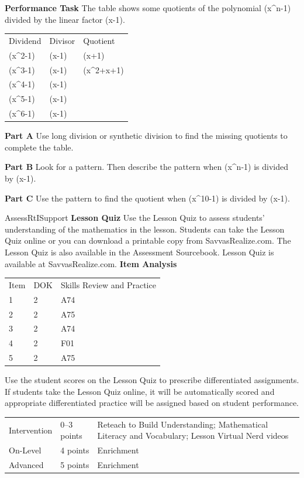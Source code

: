 \documentclass{article}
\newenvironment{practice}[2]{}{}        %
\newenvironment{te-addendum}[2]{}{}     %
\newcommand{\answer}[1]{}               %
\begin{document}
\begin{practice}{38}{3}
\textbf{Performance Task} The table shows some quotients of the polynomial (x^n-1) divided by the linear factor (x-1).
\begin{tabular}{lll}
Dividend & Divisor & Quotient \\
(x^2-1) & (x-1) & (x+1) \\
(x^3-1) & (x-1) & (x^2+x+1) \\
(x^4-1) & (x-1) & \\
(x^5-1) & (x-1) & \\
(x^6-1) & (x-1) & \\
\end{tabular}
\textbf{Part A} Use long division or synthetic division to find the missing quotients to complete the table.
\answer{(x^3+x^2+x+1); (x^4+x^3+x^2+x+1); (x^5+x^4+x^3+x^2+x+1)}
\textbf{Part B} Look for a pattern. Then describe the pattern when (x^n-1) is divided by (x-1).
\answer{When (x^n-1) is divided by (x-1), the quotient is (x^{n-1}+x^{n-2}+x^{n-3}+\cdots+x+1).}
\textbf{Part C} Use the pattern to find the quotient when (x^{10}-1) is divided by (x-1).
\answer{(x^9+x^8+x^7+x^6+x^5+x^4+x^3+x^2+x+1)}
\end{practice}
\begin{te-addendum}{Assess}{RtISupport}
\textbf{Lesson Quiz}
Use the Lesson Quiz to assess students' understanding of the mathematics in the lesson.
Students can take the Lesson Quiz online or you can download a printable copy from SavvasRealize.com. The Lesson Quiz is also available in the Assessment Sourcebook.
Lesson Quiz is available at SavvasRealize.com.
\textbf{Item Analysis}
\begin{tabular}{lll}
Item & DOK & Skills Review and Practice \\
1 & 2 & A74 \\
2 & 2 & A75 \\
3 & 2 & A74 \\
4 & 2 & F01 \\
5 & 2 & A75 \\
\end{tabular}
Use the student scores on the Lesson Quiz to prescribe differentiated assignments.
If students take the Lesson Quiz online, it will be automatically scored and appropriate differentiated practice will be assigned based on student performance.
\begin{tabular}{lll}
Intervention & 0--3 points & Reteach to Build Understanding; Mathematical Literacy and Vocabulary; Lesson Virtual Nerd videos \\
On-Level & 4 points & Enrichment \\
Advanced & 5 points & Enrichment \\
\end{tabular}
\end{te-addendum}
\end{document}
